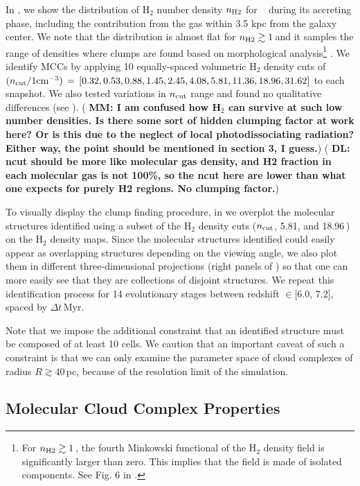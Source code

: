 \IfFileExists{emulateapjlegacy.cls}{\documentclass[iop]{emulateapjlegacy}}{\documentclass[iop]{emulateapj}}
\newcommand{\DL}[1]{({\bf \color{dlcolor} DL: #1})}
\newcommand{\MM}[1]{({\bf \color{mmcolor} MM: #1})}
\begin{document}
In , we show the distribution of H$_2$
number density $n_{\rm H2}$ for \flower~ during its accreting phase,
including the contribution from the gas within 3.5 kpc from the
galaxy center. 
%
We note that the distribution is almost flat for $n_{\rm
  H2}\gtrsim1$\,\cc and it samples the range of densities where clumps
are found based on morphological analysis\footnote{For $n_{\rm
    H2}\gtrsim1$\,\cc, the fourth Minkowski functional of the H$_{2}$
  density field is significantly larger than zero. This implies that
  the field is made of isolated components. See Fig. 6 in
  \citet{Pallottini17b}.} \citep{Pallottini17b}. We identify MCCs by
applying 10 equally-spaced volumetric H$_2$ density cuts of ${(n_{\rm
    cut}/{1 {\rm cm}^{-3})}}\,=\,[0.32, 0.53, 0.88, 1.45, 2.45, 4.08,
5.81, 11.36, 18.96, 31.62]$ to each snapshot. 
We also tested variations in
  $n_{\rm cut}$ range and found no qualitative differences (see
  ).
\MM{I am confused how H$_2$ can survive at such low number
  densities.  Is there some sort of hidden clumping factor at work
  here? Or is this due to the neglect of local photodissociating
  radiation? Either way, the point should be mentioned in section 3, I
guess.}
\DL{ncut should be more like molecular gas density, and H2 fraction in each molecular gas is not 100\%, so the ncut here are lower than
 what one expects for purely H2 regions. No clumping factor.}

To visually display 
the clump finding procedure, in  we overplot the molecular structures identified using a subset of the H$_2$ density cuts ($n_{\rm cut}$, 5.81, and 18.96\,\cc) on the H$_2$ density maps.
Since the molecular structures identified could easily appear as overlapping structures depending on the viewing angle, we also plot them in different three-dimensional projections (right panels of ) so that one can more easily see that they are collections of disjoint structures.
%
We repeat this identification process for 14 evolutionary stages between redshift \z$\in$[6.0, 7.2], spaced by $\Delta t$\,Myr.

Note that we impose the additional constraint that an identified
structure must be composed of at least 10 cells. We caution that an
important caveat of such a constraint is that we can only examine the
parameter space of cloud complexes of 
radius $R\gtrsim 40$\,pc,
because of the resolution limit of the simulation.

\subsection{Molecular Cloud Complex Properties}
\end{document}

